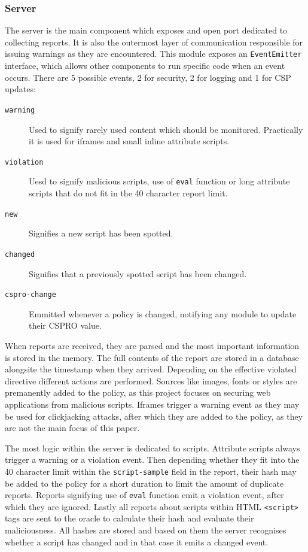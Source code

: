 \begin{description}
\subsubsection{Server}
The server is the main component which exposes and open port dedicated to collecting reports.
It is also the outermost layer of communication responsible for issuing warnings as they are encountered.
This module exposes an \texttt{EventEmitter} interface, which allows other components to run specific code when an event occurs.
There are 5 possible events, 2 for security, 2 for logging and 1 for CSP updates:
\begin{description}
	\item[\texttt{warning}]	Used to signify rarely used content which should be monitored. Practically it is used for iframes and small inline attribute scripts. 
	\item[\texttt{violation}] Uesd to signify malicious scripts, use of \texttt{eval} function or long attribute scripts that do not fit in the 40 character report limit.
	\item[\texttt{new}] Signifies a new script has been spotted.
	\item[\texttt{changed}] Signifies that a previously spotted script has been changed.
	\item[\texttt{cspro-change}] Emmitted whenever a policy is changed, notifying any module to update their CSPRO value.
\end{description}

When reports are received, they are parsed and the most important information is stored in the memory.
The full contents of the report are stored in a database alongsite the timestamp when they arrived.
Depending on the effective violated directive different actions are performed.
Sources like images, fonts or styles are premanently added to the policy, as this project focuses on securing web applications from malicious scripts.
Iframes trigger a warning event as they may be used for clickjacking attacks, after which they are added to the policy, as they are not the main focus of this paper.

The most logic within the server is dedicated to scripts.
Attribute scripts always trigger a warning or a violation event.
Then depending whether they fit into the 40 character limit within the \texttt{script-sample} field in the report, their hash may be added to the policy for a short duration to limit the amount of duplicate reports.
Reports signifying use of \texttt{eval} function emit a violation event, after which they are ignored.
Lastly all reports about scripts within HTML \texttt{<script>} tags are sent to the oracle to calculate their hash and evaluate their maliciousness.
All hashes are stored and based on them the server recognises whether a script has changed and in that case it emits a changed event.


\end{description}
